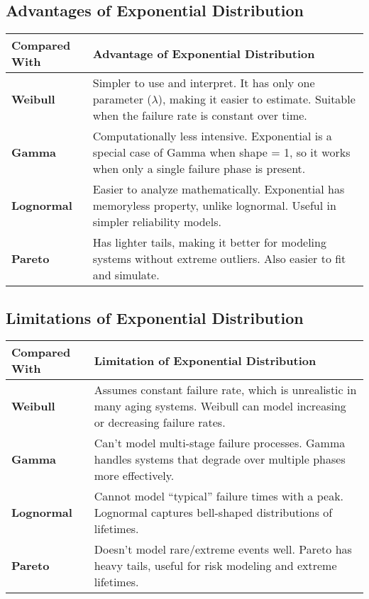\documentclass[12pt, a4paper, onecolumn, answers]{exam}
\begin{document}
\newpage


\subsection*{Advantages of Exponential Distribution}

\begin{longtable}{@{}p{4cm}p{11cm}@{}}
\toprule
\textbf{Compared With} & \textbf{Advantage of Exponential Distribution} \\ \midrule
\textbf{Weibull} & Simpler to use and interpret. It has only one parameter (\(\lambda\)), making it easier to estimate. Suitable when the failure rate is constant over time. \\
\textbf{Gamma} & Computationally less intensive. Exponential is a special case of Gamma when shape = 1, so it works when only a single failure phase is present. \\
\textbf{Lognormal} & Easier to analyze mathematically. Exponential has memoryless property, unlike lognormal. Useful in simpler reliability models. \\
\textbf{Pareto} & Has lighter tails, making it better for modeling systems without extreme outliers. Also easier to fit and simulate. \\ 
\bottomrule
\end{longtable}

\vspace{1cm}

\subsection*{Limitations of Exponential Distribution}

\begin{longtable}{@{}p{4cm}p{11cm}@{}}
\toprule
\textbf{Compared With} & \textbf{Limitation of Exponential Distribution} \\ \midrule
\textbf{Weibull} & Assumes constant failure rate, which is unrealistic in many aging systems. Weibull can model increasing or decreasing failure rates. \\
\textbf{Gamma} & Can't model multi-stage failure processes. Gamma handles systems that degrade over multiple phases more effectively. \\
\textbf{Lognormal} & Cannot model “typical” failure times with a peak. Lognormal captures bell-shaped distributions of lifetimes. \\
\textbf{Pareto} & Doesn’t model rare/extreme events well. Pareto has heavy tails, useful for risk modeling and extreme lifetimes. \\
\bottomrule
\end{longtable}
\end{document}
